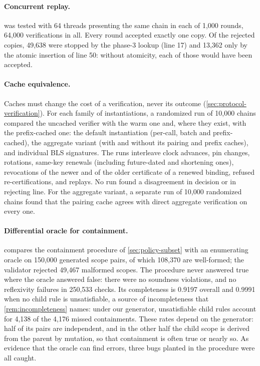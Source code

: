\documentclass[11pt,a4paper]{article}
\begin{document}
\paragraph{Concurrent replay.}
 was tested with 64 threads presenting the same chain
in each of 1,000 rounds, 64,000 verifications in all. Every round
accepted exactly one copy. Of the rejected copies, 49,638 were stopped by
the phase-3 lookup (line 17) and 13,362 only by the atomic insertion of
line 50: without atomicity, each of those would have been accepted.

\paragraph{Cache equivalence.}
Caches must change the cost of a verification, never its outcome
(\cref{sec:protocol-verification}). For each family of instantiations, a
randomized run of 10,000 chains compared the uncached verifier with the
warm one and, where they exist, with the prefix-cached one: the default
instantiation (per-call, batch and prefix-cached), the aggregate variant
(with and without its pairing and prefix caches), and individual BLS
signatures. The runs interleave clock advances, pin changes, rotations,
same-key renewals (including future-dated and shortening ones),
revocations of the newer and of the older certificate of a renewed
binding, refused re-certifications, and replays. No run found a
disagreement in decision or in rejecting line. For the aggregate
variant, a separate run of 10,000 randomized chains found that the
pairing cache agrees with direct aggregate verification on every one.

\paragraph{Differential oracle for containment.}
 compares the containment procedure of
\cref{sec:policy-subset} with an enumerating oracle on 150,000 generated
scope pairs, of which 108,370 are well-formed; the validator rejected
49,467 malformed scopes. The procedure never answered true where the
oracle answered false: there were no soundness violations, and no
reflexivity failures in 250,533 checks. Its completeness is 0.9197
overall and 0.9991 when no child rule is unsatisfiable, a source of
incompleteness that \cref{rem:incompleteness} names: under our
generator, unsatisfiable child rules account for 4,138 of the 4,176
missed containments. These
rates depend on the generator: half of its pairs are independent, and in
the other half the child scope is derived from the parent by mutation,
so that containment is often true or nearly so. As evidence that the
oracle can find errors, three bugs planted in the procedure were all
caught.
\end{document}

